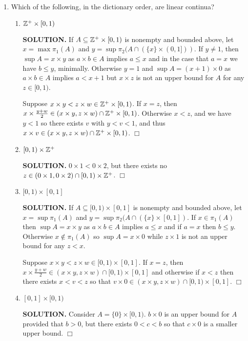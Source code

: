 \documentclass{article}
\begin{document}
\begin{enumerate}
    \item Which of the following, in the dictionary order, are linear continua?
    \begin{enumerate}
        \item $\mathbb{Z}^+ \times [0, 1)$

        {\bf SOLUTION.} If $A \subseteq \mathbb{Z}^+ \times [0, 1)$ is nonempty and bounded above, let $x = \max \pi_1(A)$ and $y = \sup \pi_2 (A \cap (\{x\} \times (0, 1]))$. If $y \neq 1$, then $\sup A = x \times y$ as $a \times b \in A$ implies $a \leq x$ and in the case that $a = x$ we have $b \leq y$, minimally. Otherwise $y = 1$ and $\sup A = (x+1) \times 0$ as $a \times b \in A$ implies $a < x+1$ but $x \times z$ is not an upper bound for $A$ for any $z \in [0, 1)$.

        Suppose $x \times y < z \times w \in \mathbb{Z}^+ \times [0, 1)$. If $x = z$, then $x \times \frac{y+w}2 \in (x \times y, z \times w) \cap \mathbb{Z}^+ \times [0, 1)$. Otherwise $x < z$, and we have $y < 1$ so there exists $v$ with $y < v < 1$, and thus $x \times v \in (x \times y, z \times w) \cap \mathbb{Z}^+ \times [0, 1)$. $\Box$

        \item $[0, 1) \times \mathbb{Z}^+$

        {\bf SOLUTION.} $0 \times 1 < 0 \times 2$, but there exists no $z \in (0 \times 1, 0 \times 2) \cap [0, 1) \times \mathbb{Z}^+$. $\Box$

        \item $[0, 1) \times [0, 1]$

        {\bf SOLUTION.} If $A \subseteq [0, 1) \times [0, 1]$ is nonempty and bounded above, let $x = \sup \pi_1(A)$ and $y = \sup \pi_2(A \cap (\{x\} \times[0, 1])$. If $x \in \pi_1(A)$ then $\sup A = x \times y$ as $a \times b \in A$ implies $a \leq x$ and if $a = x$ then $b \leq y$. Otherwise $x \notin \pi_1(A)$ so $\sup A = x \times 0$ while $z \times 1$ is not an upper bound for any $z < x$.

        Suppose $x \times y < z \times w \in [0, 1) \times [0, 1]$. If $x = z$, then $x \times \frac{y+w}2 \in (x \times y, z \times w) \cap [0, 1) \times [0, 1]$ and otherwise if $x < z$ then there exists $x < v< z$ so that $v \times 0 \in (x\times y, z \times w) \cap [0, 1) \times [0, 1]$. $\Box$ 

        \item $[0, 1] \times [0, 1)$

        {\bf SOLUTION.} Consider $A = \{0\} \times [0, 1)$. $b \times 0$ is an upper bound for $A$ provided that $b > 0$, but there exists $0 < c < b$ so that $c \times 0$ is a smaller upper bound. $\Box$
    \end{enumerate}


\end{enumerate}
\end{document}
